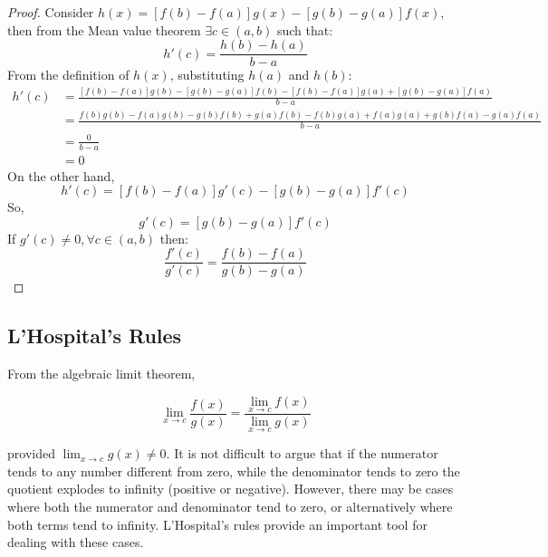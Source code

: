 \begin{proof}
    Consider $h(x) = [f(b) - f(a)]g(x) - [g(b) - g(a)]f(x)$, then from the Mean value theorem $\exists c \in (a,b)$ such that:
    \begin{equation*}
        h'(c) = \frac{h(b) - h(a)}{b-a}
    \end{equation*}
    From the definition of $h(x)$, substituting $h(a)$ and $h(b)$:
    \begin{align*}
        h'(c) &= \frac{[f(b) - f(a)]g(b) - [g(b) - g(a)]f(b) - [f(b) - f(a)]g(a) + [g(b) - g(a)]f(a)}{b-a} \\
        &= \frac{f(b)g(b) - f(a)g(b) - g(b)f(b) + g(a)f(b) - f(b)g(a) + f(a)g(a) + g(b)f(a) - g(a)f(a)}{b-a} \\
        &= \frac{0}{b-a} \\
        &= 0
    \end{align*}
    On the other hand,
    \begin{equation*}
        h'(c) = [f(b) - f(a)]g'(c) - [g(b) - g(a)]f'(c)
    \end{equation*}
    So,
    \begin{equation*}
        [f(b) - f(a)]g'(c) = [g(b) - g(a)]f'(c)
    \end{equation*}
    If $g'(c) \neq 0, \forall c \in (a,b)$ then:
    \begin{equation*}
        \frac{f'(c)}{g'(c)} = \frac{f(b) - f(a)}{g(b) - g(a)}
    \end{equation*}
\end{proof}

\subsection{L'Hospital's Rules}

From the algebraic limit theorem,

\begin{equation*}
    \lim \limits_{x \to c} \frac{f(x)}{g(x)} = \frac{\lim \limits_{x \to c} f(x)}{\lim \limits_{x \to c} g(x)}
\end{equation*}

provided $\lim_{x \to c} g(x) \neq 0$. It is not difficult to argue that if the numerator tends to any number different from zero, while the denominator tends to zero the quotient explodes to infinity (positive or negative). However, there may be cases where both the numerator and denominator tend to zero, or alternatively where both terms tend to infinity. L'Hospital's rules provide an important tool for dealing with these cases.

